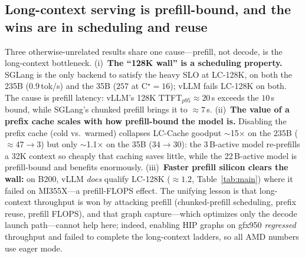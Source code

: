 \subsection{Long-context serving is prefill-bound, and the wins are in scheduling and reuse}
\label{subsec:insight-prefill}
Three otherwise-unrelated results share one cause---prefill, not decode, is the
long-context bottleneck. (i)~\textbf{The ``128K wall'' is a scheduling property.}
SGLang is the only backend to satisfy the heavy SLO at LC-128K, on both the 235B
($0.9$\,tok/s) and the 35B ($257$ at C$^\star{=}16$); vLLM fails LC-128K on both. The cause is
prefill latency: vLLM's 128K TTFT$_{p95}\!\approx\!20$\,s exceeds the $10$\,s
bound, while SGLang's chunked prefill brings it to $\approx7$\,s. (ii)~\textbf{The
value of a prefix cache scales with how prefill-bound the model is.} Disabling the
prefix cache (cold vs.\ warmed) collapses LC-Cache goodput $\sim$15$\times$ on the
235B ($\approx47\!\to\!3$) but only $\sim$1.1$\times$ on the 35B ($34\!\to\!30$):
the 3\,B-active model re-prefills a 32K context so cheaply that caching saves
little, while the 22\,B-active model is prefill-bound and benefits enormously.
(iii)~\textbf{Faster prefill silicon clears the wall:} on B200, vLLM \emph{does}
qualify LC-128K ($\approx1.2$, Table~\ref{tab:main}) where it failed on MI355X---a
prefill-FLOPS effect. The unifying lesson is that long-context throughput is won by
attacking prefill (chunked-prefill scheduling, prefix reuse, prefill FLOPS), and
that graph capture---which optimizes only the decode launch path---cannot help
here; indeed, enabling HIP graphs on gfx950 \emph{regressed} throughput and failed
to complete the long-context ladders, so all AMD numbers use eager mode.

